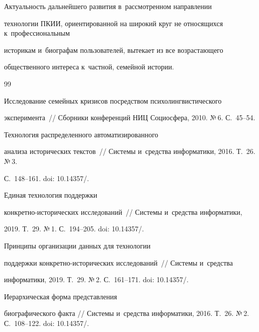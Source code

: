   Актуальность дальнейшего развития в~рассмотренном направлении 


технологии ПКИИ,  ориентированной на широкий круг не относящихся к~профессиональным 


историкам и~биографам пользователей, вытекает из все воз\-рас\-та\-юще\-го 


общественного интереса к~част\-ной, семейной истории.


  


{\small\frenchspacing


{%




\begin{thebibliography}{99}




   Исследование семейных кризисов посредством психолингвистического 


эксперимента~/\!\!/ Сборники конференций НИЦ Социосфера, 2010. №\,6. С.~45--54.




   Технология распределенного автоматизированного 


анализа исторических текстов~/\!\!/ Системы и~средства информатики, 2016. Т.~26. №\,3. 


С.~148--161. doi: 10.14357\!/.




   Единая технология поддержки  


кон\-крет\-но-ис\-то\-ри\-че\-ских исследований~/\!\!/ Системы и~средства информатики, 


2019. Т.~29. №\,1. С.~194--205. doi: 10.14357\!/.




   Принципы организации данных для технологии 


поддержки кон\-крет\-но-ис\-то\-ри\-че\-ских исследований~/\!\!/ Системы и~средства 


информатики, 2019. Т.~29. №\,2. С.~161--171. doi: 10.14357\!/.




   Иерархическая форма представления 


биографического факта /\!\!/ Системы и~средства информатики, 2016. Т.~26. №\,2. С.~108--122. doi: 10.14357\!/.



\end{thebibliography}}}
